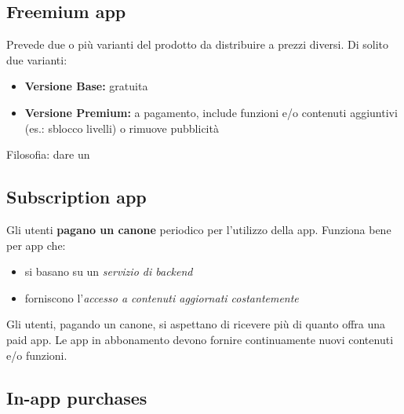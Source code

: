 \subsection{Freemium app}
\par Prevede due o più varianti del prodotto da distribuire a prezzi diversi. Di solito due varianti:
\begin{itemize}
    \item \textbf{Versione Base:} gratuita
    \item \textbf{Versione Premium:} a pagamento, include funzioni e/o contenuti aggiuntivi (es.: sblocco livelli) o rimuove pubblicità
\end{itemize}
\par Filosofia: dare un

\subsection{Subscription app}
\par Gli utenti \textbf{pagano un canone} periodico per l'utilizzo della app. Funziona bene per app che:
\begin{itemize}
    \item si basano su un \textit{servizio di backend}
    \item forniscono l'\textit{accesso a contenuti aggiornati costantemente}
\end{itemize}
\par Gli utenti, pagando un canone, si aspettano di ricevere più di quanto offra una paid app. Le app in abbonamento devono fornire continuamente nuovi contenuti e/o funzioni.

\subsection{In-app purchases}